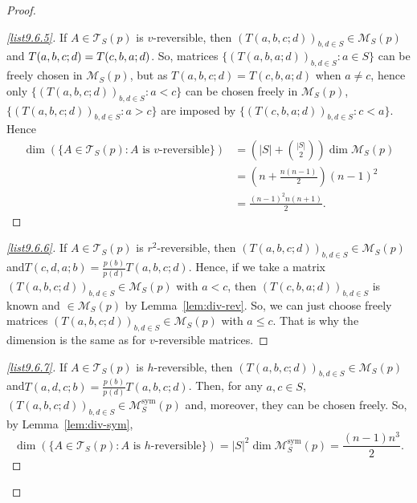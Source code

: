\documentclass[AHL,Unicode,longabstracts]{cedram}
\newcounter{a}
\newcommand{\triang}[2]{\mathcal{T}_{#1} \left(#2 \right)}
\DeclareMathOperator{\sym}{sym}
\begin{document}
\begin{proof}
\begin{proof}[{\eqref{list9.6.5}}] If $A \in \triang{S}{p}$ is $v$-reversible, then $(T(a,b,c;d))_{b,d
\in S} \in \mathcal{M}_S(p)$ and $T(a,b,\linebreak c;d)= T(c,b,a;d)$. So, matrices $\{(T(a,b,a;d))_{b,d \in S} : a \in S\}$ can be freely chosen in $\mathcal{M}_S(p)$, but as $T(a,b,c;d) = T(c,b,a;d)$ when $a \neq c$, hence only $\{ (T(a,b,c;d))_{b,d \in S} : a<c \}$ can be chosen freely in $\mathcal{M}_S(p)$, $\{ (T(a,b,c;d))_{b,d \in S} : a>c \}$ are imposed by $\{ (T(c,b,a;d))_{b,d \in S} : c<a \}$. Hence
\begin{align*}
\dim \left(\{A \in \triang{S}{p} : \text{$A$ is $v$-reversible}\} \right) & = \left(|S| + \binom{|S|}{2} \right) \dim \mathcal{M}_S(p) \\
& = \left(n + \frac{n(n-1)}{2} \right) (n-1)^2\\
& = \frac{(n-1)^2 n (n+1)}{2}.
\end{align*}
\let\qed\relax
\end{proof}

\begin{proof}[{\eqref{list9.6.6}}] If $A \in \triang{S}{p}$ is $r^2$-reversible, then $(T(a,b,c;d))_{b,d \in S} \in \mathcal{M}_S(p)$ and\linebreak $T(c,d,a;b)= \frac{p(b)}{p(d)}T(a,b,c;d)$. Hence, if we take a matrix $(T(a,b,c;d))_{b,d \in S} \in \mathcal{M}_S(p)$ with $a<c$, then $(T(c,b,a;d))_{b,d \in S}$ is known and $\in \mathcal{M}_S(p)$ by Lemma~\ref{lem:div-rev}. So, we can just choose freely matrices $(T(a,b,c;d))_{b,d \in S} \in \mathcal{M}_S(p)$ with $a \leq c$. That is why the dimension is the same as for $v$-reversible matrices.
\let\qed\relax
\end{proof}

\begin{proof}[{\eqref{list9.6.7}}] If $A \in \triang{S}{p}$ is $h$-reversible, then $(T(a,b,c;d))_{b,d
\in S} \in \mathcal{M}_S(p)$ and\linebreak $T(a,d,c;b)= \frac{p(b)}{p(d)} T(a,b,c;d)$. Then, for any $a,c \in S$, $(T(a,b,c;d))_{b,d \in S} \in
\mathcal{M}^{\sym}_S(p)$ and, moreover, they can be chosen freely. So, by Lemma~\ref{lem:div-sym},
\[
\dim \left(\{A \in \triang{S}{p} : \text{$A$ is $h$-reversible}\} \right) = |S|^2 \dim \mathcal{M}^{\sym}_S(p) = \frac{(n-1) n^3}{2}.
\]
\let\qed\relax
\end{proof}


\end{proof}
\end{document}
